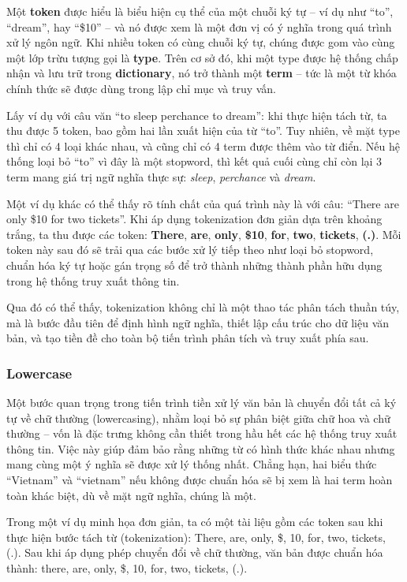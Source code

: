 Một \textbf{token} được hiểu là biểu hiện cụ thể của một chuỗi ký tự -- ví dụ như ``to'', ``dream'', hay ``\$10'' -- và nó được xem là một đơn vị có ý nghĩa trong quá trình xử lý ngôn ngữ. Khi nhiều token có cùng chuỗi ký tự, chúng được gom vào cùng một lớp trừu tượng gọi là \textbf{type}. Trên cơ sở đó, khi một type được hệ thống chấp nhận và lưu trữ trong \textbf{dictionary}, nó trở thành một \textbf{term} -- tức là một từ khóa chính thức sẽ được dùng trong lập chỉ mục và truy vấn.

Lấy ví dụ với câu văn ``to sleep perchance to dream'': khi thực hiện tách từ, ta thu được 5 token, bao gồm hai lần xuất hiện của từ ``to''. Tuy nhiên, về mặt type thì chỉ có 4 loại khác nhau, và cũng chỉ có 4 term được thêm vào từ điển. Nếu hệ thống loại bỏ ``to'' vì đây là một stopword, thì kết quả cuối cùng chỉ còn lại 3 term mang giá trị ngữ nghĩa thực sự: \textit{sleep}, \textit{perchance} và \textit{dream}.

Một ví dụ khác có thể thấy rõ tính chất của quá trình này là với câu: ``There are only \$10 for two tickets''. Khi áp dụng tokenization đơn giản dựa trên khoảng trắng, ta thu được các token:
\textbf{There}, \textbf{are}, \textbf{only}, \textbf{\$10}, \textbf{for}, \textbf{two}, \textbf{tickets}, \textbf{(.)}.
Mỗi token này sau đó sẽ trải qua các bước xử lý tiếp theo như loại bỏ stopword, chuẩn hóa ký tự hoặc gán trọng số để trở thành những thành phần hữu dụng trong hệ thống truy xuất thông tin.

Qua đó có thể thấy, tokenization không chỉ là một thao tác phân tách thuần túy, mà là bước đầu tiên để định hình ngữ nghĩa, thiết lập cấu trúc cho dữ liệu văn bản, và tạo tiền đề cho toàn bộ tiến trình phân tích và truy xuất phía sau.

\subsubsection{Lowercase}
Một bước quan trọng trong tiến trình tiền xử lý văn bản là chuyển đổi tất cả ký tự về chữ thường (lowercasing), nhằm loại bỏ sự phân biệt giữa chữ hoa và chữ thường -- vốn là đặc trưng không cần thiết trong hầu hết các hệ thống truy xuất thông tin. Việc này giúp đảm bảo rằng những từ có hình thức khác nhau nhưng mang cùng một ý nghĩa sẽ được xử lý thống nhất. Chẳng hạn, hai biểu thức ``Vietnam'' và ``vietnam'' nếu không được chuẩn hóa sẽ bị xem là hai term hoàn toàn khác biệt, dù về mặt ngữ nghĩa, chúng là một.

Trong một ví dụ minh họa đơn giản, ta có một tài liệu gồm các token sau khi thực hiện bước tách từ (tokenization):
There, are, only, \$, 10, for, two, tickets, (.).
Sau khi áp dụng phép chuyển đổi về chữ thường, văn bản được chuẩn hóa thành:
there, are, only, \$, 10, for, two, tickets, (.).

